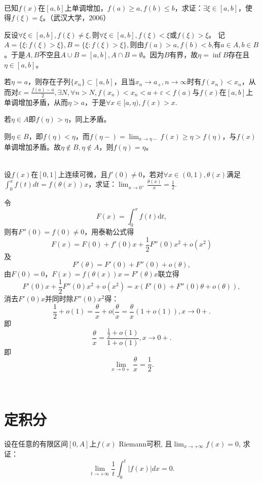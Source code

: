 \begin{example}
\hfill\\
  已知$f(x)$在$[a,b]$上单调增加，$f(a)\geq a,f(b)\leq b$，求证：$\exists\xi\in[a,b]$，使得$f(\xi)=\xi$。（武汉大学，2006）
  
  
  反设$\forall\xi\in[a,b],f(\xi)\neq\xi,$则$\forall\xi\in[a,b],f(\xi)<\xi$或$f(\xi)>\xi$。
  记$A=\{\xi:f(\xi)>\xi\},B=\{\xi:f(\xi)>\xi\},$则由$f(a)>a,f(b)<b$,有$a\in A,b\in B$。于是$A,B$不空且$A\cup B=[a,b],A\cap B=\emptyset$。因为$B$有界，故$\eta=\inf B$存在且$\eta\in[a,b]$。
  
  若$\eta=a$，则存在子列$\{x_n\}\subset[a,b]$，且当$x_n\rightarrow a_+,n\rightarrow\infty$时有$f(x_n)<x_n$，从而对$\varepsilon=\frac{f(a)-a}{2},\exists N,\forall n>N,f(x_n)<x_n<a+\varepsilon<f(a)$与$f(x)$在$[a,b]$上单调增加矛盾，从而$\eta>a$，于是$\forall x\in[a,\eta),f(x)>x.$
  
  若$\eta\in A$即$f(\eta)>\eta$，同上矛盾。
  
  则$\eta\in B$，即$f(\eta)<\eta$，而$f(\eta-)=\lim_{x\rightarrow\eta-}f(x)\geq\eta>f(\eta)$，与$f(x)$单调增加矛盾。故$\eta\not\in B,\eta\not\in A$，则$f(\eta)=\eta$。
  \end{example}
  \begin{example}
  \hfill\\
   设$f(x)$在$[0,1]$上连续可微，且$f'(0)\neq0$，若对$\forall x\in(0,1),\theta(x)$满足$\int_0^xf(t)dt=f(\theta(x))x$，求证：$\displaystyle \lim_{x\rightarrow 0^+}\frac{\theta(x)}x=\frac12$.
   
     令$$F(x)=\int_0^xf(t)\mathrm{d}t,$$
  则有$F''(0)=f(0)\neq0$，用泰勒公式得
  $$F(x)=F(0)+f'(0)x+\frac{1}{2}F''(0)x^2+o(x^2)$$
  及
  $$F'(\theta)=F'(0)+F''(0)+o(\theta),$$
  由$F(0)=0$，$F(x)=f(\theta(x))x=F'(\theta)x$联立得
  $$F'(0)x+\frac{1}{2}F''(0)x^2+o(x^2)=x(F'(0)+F''(0)\theta+o(\theta)),$$
  消去$F'(0)x$并同时除$F''(0)x^2$得：
  $$\frac{1}{2}+o(1)=\frac{\theta}{x}+o(\frac{\theta}{x}=\frac{\theta}{x}(1+o(1)),x\rightarrow0+.$$
  即
  $$\frac{\theta}{x}=\frac{\frac{1}{2}+o(1)}{1+o(1)},x\rightarrow0+.$$
  即
  $$\lim_{x\rightarrow0+}\frac{\theta}{x}=\frac{1}{2}.$$
  \end{example}
  
  
 \hfill\\
 
  
\section{定积分}

  \begin{example}
  设在任意的有限区间$[0,A]$上$f(x)$ Riemann可积,
  且$\lim_{x\rightarrow+\infty}f(x)=0$,
  求证：
  \begin{equation} 
  \lim_{t\rightarrow+\infty}\frac 1t\int_0^t|f(x)|dx=0.
  \end{equation} 
\end{example}

